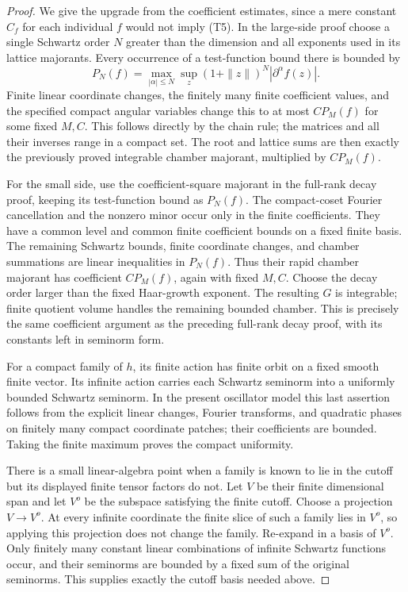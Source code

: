 \begin{proof}
We give the upgrade from the coefficient estimates, since a mere
constant \(C_f\) for each individual \(f\) would not imply (T5).
In the large-side proof choose a single Schwartz order \(N\) greater
than the dimension and all exponents used in its lattice majorants.
Every occurrence of a test-function bound there is bounded by
\[
 P_N(f)=\max_{|\alpha|\le N}\sup_z
                 (1+\|z\|)^N|\partial^\alpha f(z)|.
\]
Finite linear coordinate changes, the finitely many finite
coefficient values, and the specified compact angular variables change
this to at most \(C P_M(f)\) for some fixed \(M,C\).
This follows directly by the chain rule; the matrices and all their
inverses range in a compact set. The root and lattice sums are then
exactly the previously proved integrable chamber majorant, multiplied
by \(C P_M(f)\).

For the small side, use the coefficient-square majorant in the
full-rank decay proof, keeping its test-function bound as \(P_N(f)\).
The compact-coset Fourier cancellation and the nonzero minor occur
only in the finite coefficients. They have a common level and common
finite coefficient bounds on a fixed finite basis. The remaining
Schwartz bounds, finite coordinate changes, and chamber summations
are linear inequalities in \(P_N(f)\). Thus their rapid chamber
majorant has coefficient \(C P_M(f)\), again with fixed \(M,C\).
Choose the decay order larger than the fixed Haar-growth exponent.
The resulting \(G\) is integrable; finite quotient volume handles the
remaining bounded chamber. This is precisely the same coefficient
argument as the preceding full-rank decay proof, with its constants
left in seminorm form.

For a compact family of \(h\), its finite action has finite orbit on
a fixed smooth finite vector. Its infinite action carries each
Schwartz seminorm into a uniformly bounded Schwartz seminorm.
In the present oscillator model this last assertion follows from
the explicit linear changes, Fourier transforms, and quadratic
phases on finitely many compact coordinate patches; their coefficients
are bounded. Taking the finite maximum proves the compact uniformity.

There is a small linear-algebra point when a family is known to lie
in the cutoff but its displayed finite tensor factors do not.
Let \(V\) be their finite dimensional span and let \(V^o\) be the
subspace satisfying the finite cutoff. Choose a projection
\(V\longrightarrow V^o\). At every infinite coordinate the finite
slice of such a family lies in \(V^o\), so applying this projection
does not change the family. Re-expand in a basis of \(V^o\).
Only finitely many constant linear combinations of infinite Schwartz
functions occur, and their seminorms are bounded by a fixed sum of
the original seminorms. This supplies exactly the cutoff basis needed
above.
\end{proof}

